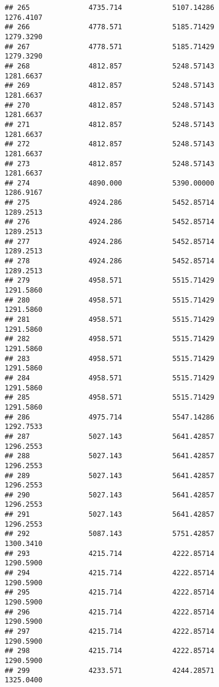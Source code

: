 \documentclass[]{article}
\begin{document}
\begin{verbatim}
## 265              4735.714            5107.14286                1276.4107
## 266              4778.571            5185.71429                1279.3290
## 267              4778.571            5185.71429                1279.3290
## 268              4812.857            5248.57143                1281.6637
## 269              4812.857            5248.57143                1281.6637
## 270              4812.857            5248.57143                1281.6637
## 271              4812.857            5248.57143                1281.6637
## 272              4812.857            5248.57143                1281.6637
## 273              4812.857            5248.57143                1281.6637
## 274              4890.000            5390.00000                1286.9167
## 275              4924.286            5452.85714                1289.2513
## 276              4924.286            5452.85714                1289.2513
## 277              4924.286            5452.85714                1289.2513
## 278              4924.286            5452.85714                1289.2513
## 279              4958.571            5515.71429                1291.5860
## 280              4958.571            5515.71429                1291.5860
## 281              4958.571            5515.71429                1291.5860
## 282              4958.571            5515.71429                1291.5860
## 283              4958.571            5515.71429                1291.5860
## 284              4958.571            5515.71429                1291.5860
## 285              4958.571            5515.71429                1291.5860
## 286              4975.714            5547.14286                1292.7533
## 287              5027.143            5641.42857                1296.2553
## 288              5027.143            5641.42857                1296.2553
## 289              5027.143            5641.42857                1296.2553
## 290              5027.143            5641.42857                1296.2553
## 291              5027.143            5641.42857                1296.2553
## 292              5087.143            5751.42857                1300.3410
## 293              4215.714            4222.85714                1290.5900
## 294              4215.714            4222.85714                1290.5900
## 295              4215.714            4222.85714                1290.5900
## 296              4215.714            4222.85714                1290.5900
## 297              4215.714            4222.85714                1290.5900
## 298              4215.714            4222.85714                1290.5900
## 299              4233.571            4244.28571                1325.0400

\end{verbatim}
\end{document}
